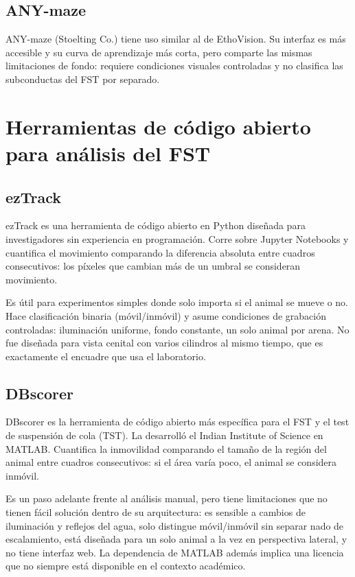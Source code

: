\subsection{ANY-maze}

ANY-maze (Stoelting Co.) tiene uso similar al de EthoVision. Su interfaz es más
accesible y su curva de aprendizaje más corta, pero comparte las mismas limitaciones
de fondo: requiere condiciones visuales controladas y no clasifica las subconductas del
FST por separado.

\section{Herramientas de código abierto para análisis del FST}

\subsection{ezTrack}

ezTrack \cite{pennington2019_eztrack} es una herramienta de código abierto en Python
diseñada para investigadores sin experiencia en programación. Corre sobre Jupyter
Notebooks y cuantifica el movimiento comparando la diferencia absoluta entre cuadros
consecutivos: los píxeles que cambian más de un umbral se consideran movimiento.

Es útil para experimentos simples donde solo importa si el animal se mueve o no. Hace
clasificación binaria (móvil/inmóvil) y asume condiciones de grabación controladas:
iluminación uniforme, fondo constante, un solo animal por arena. No fue diseñada para
vista cenital con varios cilindros al mismo tiempo, que es exactamente el encuadre
que usa el laboratorio.

\subsection{DBscorer}

DBscorer \cite{nandi2021_dbscorer} es la herramienta de código abierto más específica
para el FST y el test de suspensión de cola (TST). La desarrolló el Indian Institute of
Science en MATLAB. Cuantifica la inmovilidad comparando el tamaño de la región del
animal entre cuadros consecutivos: si el área varía poco, el animal se considera inmóvil.

Es un paso adelante frente al análisis manual, pero tiene limitaciones que no tienen
fácil solución dentro de su arquitectura: es sensible a cambios de iluminación y
reflejos del agua, solo distingue móvil/inmóvil sin separar nado de escalamiento,
está diseñada para un solo animal a la vez en perspectiva lateral, y no tiene interfaz
web. La dependencia de MATLAB además implica una licencia que no siempre está
disponible en el contexto académico.

